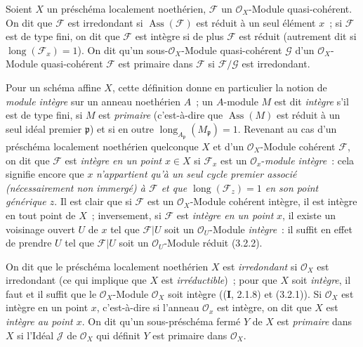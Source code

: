 \begin{definition}[3.2.4]
\label{IV.2.3.2.4-fr}
Soient $X$ un préschéma localement noethérien, $\mathcal F$ un
$\mathcal O_X$-Module quasi-cohérent. On dit que $\mathcal F$ est
irredondant si $\operatorname{Ass}(\mathcal F)$ est réduit à un seul
élément $x$~; si $\mathcal F$ est de type fini, on dit que $\mathcal F$ est
intègre si de plus $\mathcal F$ est réduit \textup{(autrement dit si
$\operatorname{long}(\mathcal F_x)=1$)}. On dit qu'un sous-$\mathcal O_X$-Module
quasi-cohérent $\mathcal G$ d'un $\mathcal O_X$-Module quasi-cohérent
$\mathcal F$ est primaire dans $\mathcal F$ si
$\mathcal F/\mathcal G$ est irredondant.
\end{definition}

Pour un schéma affine $X$, cette définition donne en particulier la notion de
\emph{module intègre} sur un anneau noethérien $A$~; un $A$-module $M$ est dit
\emph{intègre} s'il est de type fini, si $M$ est \emph{primaire} (c'est-à-dire
que $\operatorname{Ass}(M)$ est réduit à un seul idéal premier
$\mathfrak p$) et si en outre
$\operatorname{long}_{A_\mathfrak p}(M_\mathfrak p)=1$. Revenant au cas d'un
préschéma localement noethérien quelconque $X$ et d'un
$\mathcal O_X$-Module cohérent $\mathcal F$, on dit que $\mathcal F$ est
\emph{intègre en un point} $x\in X$ si $\mathcal F_x$ est un
$\mathcal O_x$-\emph{module intègre}~: cela signifie encore que $x$
\emph{n'appartient qu'à un seul cycle premier associé (nécessairement non
immergé) à $\mathcal F$ et que $\operatorname{long}(\mathcal F_z)=1$ en son
point générique $z$}. Il est clair que si $\mathcal F$ est un
$\mathcal O_X$-Module cohérent intègre, il est intègre en tout point de $X$~;
inversement, si $\mathcal F$ est \emph{intègre en un point} $x$, il existe un
voisinage ouvert $U$ de $x$ tel que $\mathcal F|U$
soit un $\mathcal O_U$-Module \emph{intègre}~: il suffit en effet de prendre
$U$ tel que $\mathcal F|U$ soit un $\mathcal O_U$-Module réduit (3.2.2).

On dit que le préschéma localement noethérien $X$ est \emph{irredondant} si
$\mathcal O_X$ est irredondant (ce qui implique que $X$ est
\emph{irréductible})~; pour que $X$ soit \emph{intègre}, il faut et il suffit
que le $\mathcal O_X$-Module $\mathcal O_X$ soit intègre ((\textbf{I}, 2.1.8) et
(3.2.1)). Si $\mathcal O_X$ est intègre en un point $x$, c'est-à-dire si
l'anneau $\mathcal O_x$ est intègre, on dit que $X$ est \emph{intègre au point
$x$}. On dit qu'un sous-préschéma fermé $Y$ de $X$ est \emph{primaire} dans
$X$ si l'Idéal $\mathcal J$ de $\mathcal O_X$ qui définit $Y$ est primaire
dans $\mathcal O_X$.

